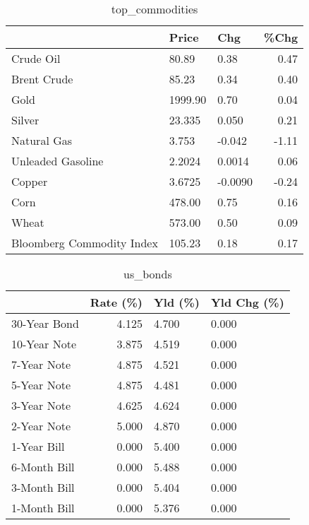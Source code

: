 \documentclass{article}%
\begin{document}
\begin{table}[htbp]%
\caption{top\_commodities}%
\centering%
\begin{adjustbox}{width=1\textwidth}%
\begin{tabular}{lllr}
\toprule
                          &   Price &     Chg &  \%Chg \\
\midrule
               Crude Oil  &   80.89 &    0.38 &  0.47 \\
             Brent Crude  &   85.23 &    0.34 &  0.40 \\
                    Gold  & 1999.90 &    0.70 &  0.04 \\
                  Silver  &  23.335 &   0.050 &  0.21 \\
             Natural Gas  &   3.753 &  -0.042 & -1.11 \\
       Unleaded Gasoline  &  2.2024 &  0.0014 &  0.06 \\
                  Copper  &  3.6725 & -0.0090 & -0.24 \\
                    Corn  &  478.00 &    0.75 &  0.16 \\
                   Wheat  &  573.00 &    0.50 &  0.09 \\
Bloomberg Commodity Index &  105.23 &    0.18 &  0.17 \\
\bottomrule
\end{tabular}
%
\end{adjustbox}%
\end{table}

%


\begin{table}[htbp]%
\caption{us\_bonds}%
\centering%
\begin{adjustbox}{width=1\textwidth}%
\begin{tabular}{lrll}
\toprule
             &  Rate (\%) & Yld (\%) & Yld Chg (\%) \\
\midrule
30-Year Bond &     4.125 &   4.700 &       0.000 \\
10-Year Note &     3.875 &   4.519 &       0.000 \\
 7-Year Note &     4.875 &   4.521 &       0.000 \\
 5-Year Note &     4.875 &   4.481 &       0.000 \\
 3-Year Note &     4.625 &   4.624 &       0.000 \\
 2-Year Note &     5.000 &   4.870 &       0.000 \\
 1-Year Bill &     0.000 &   5.400 &       0.000 \\
6-Month Bill &     0.000 &   5.488 &       0.000 \\
3-Month Bill &     0.000 &   5.404 &       0.000 \\
1-Month Bill &     0.000 &   5.376 &       0.000 \\
\bottomrule
\end{tabular}
%
\end{adjustbox}%
\end{table}
\end{document}
